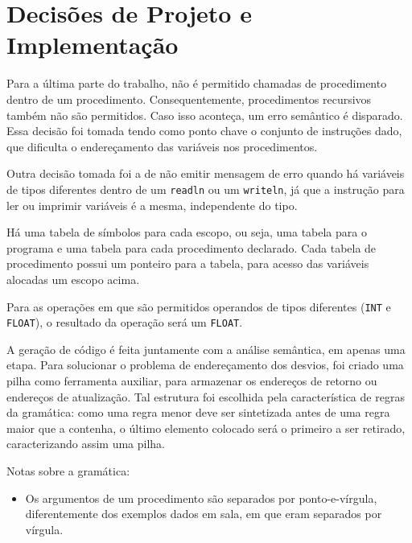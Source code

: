 \section{Decisões de Projeto e Implementação}
\label{sec:decisoes}

Para a última parte do trabalho, não é permitido chamadas de
procedimento dentro de um procedimento. Consequentemente, procedimentos
recursivos também não são permitidos. Caso isso aconteça, um erro semântico é
disparado. Essa decisão foi tomada tendo como ponto chave o conjunto de
instruções dado, que dificulta o endereçamento das variáveis nos procedimentos.

Outra decisão tomada foi a de não emitir mensagem de erro quando há variáveis
de tipos diferentes dentro de um \texttt{readln} ou um \texttt{writeln}, já que
a instrução para ler ou imprimir variáveis é a mesma, independente do tipo.

Há uma tabela de símbolos para cada escopo, ou seja, uma tabela para o programa
e uma tabela para cada procedimento declarado. Cada tabela de procedimento
possui um ponteiro para a tabela, para acesso das variáveis alocadas um escopo
acima.

Para as operações em que são permitidos operandos de tipos diferentes 
(\texttt{INT} e \texttt{FLOAT}), o resultado da operação será um \texttt{FLOAT}.

A geração de código é feita juntamente com a análise semântica, em apenas uma
etapa. Para solucionar o problema de endereçamento dos desvios, foi criado uma
pilha como ferramenta auxiliar, para armazenar os endereços de retorno ou
endereços de atualização. Tal estrutura foi escolhida pela característica de
regras da gramática: como uma regra menor deve ser sintetizada antes de uma
regra maior que a contenha, o último elemento colocado será o primeiro a ser
retirado, caracterizando assim uma pilha.

Notas sobre a gramática:
\begin{itemize}
	\item Os argumentos de um procedimento são separados por ponto-e-vírgula,
	diferentemente dos exemplos dados em sala, em que eram separados por
	vírgula.
\end{itemize}

